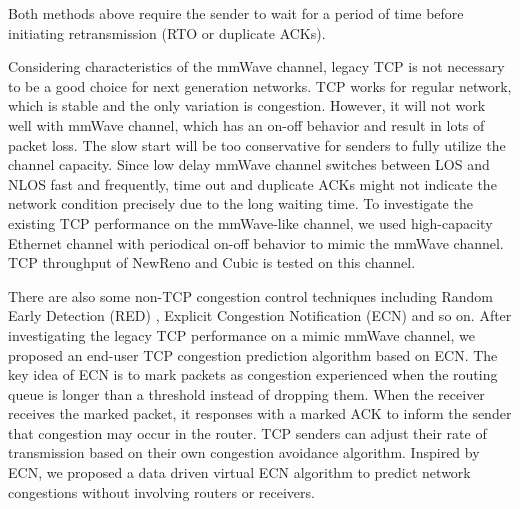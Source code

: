 Both methods above require the sender to wait for a period of time before initiating retransmission (RTO or duplicate ACKs). 
\par Considering characteristics of the mmWave channel, legacy TCP is not necessary to be a good choice for next generation networks. TCP works for regular network, which is stable and the only variation is congestion. However, it will not work well with mmWave channel, which has an on-off behavior and result in lots of packet loss. The slow start will be too conservative for senders to fully utilize the channel capacity. Since low delay mmWave channel switches between LOS and NLOS fast and frequently, time out and duplicate ACKs might not indicate the network condition precisely due to the long waiting time. To investigate the existing TCP performance on the mmWave-like channel, we used high-capacity Ethernet channel with periodical on-off behavior to mimic the mmWave channel. TCP throughput of NewReno and Cubic \cite{grieco2004performance, ha2008cubic} is tested on this channel. 
\par There are also some non-TCP congestion control techniques including Random Early Detection (RED) \cite{lin1997dynamics}, Explicit Congestion Notification (ECN) \cite{ramakrishnan2001rfc} and so on. After investigating the legacy TCP performance on a mimic mmWave channel, we proposed an end-user TCP congestion prediction algorithm based on ECN. The key idea of ECN is to mark packets as congestion experienced when the routing queue is longer than a threshold instead of dropping them. When the receiver receives the marked packet, it responses with a marked ACK to inform the sender that congestion may occur in the router. TCP senders can adjust their rate of transmission based on their own congestion avoidance algorithm. Inspired by ECN, we proposed a data driven virtual ECN algorithm to predict network congestions without involving routers or receivers.
